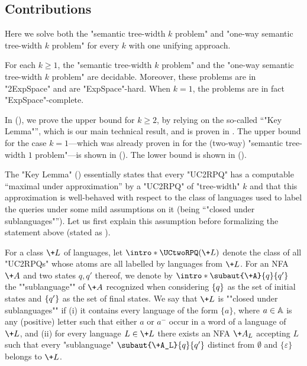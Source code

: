 \subsection{\AP{}Contributions}
Here we solve both the "semantic tree-width $k$ problem" and "one-way semantic tree-width $k$ problem" for every $k$ with one unifying approach.
\begin{theorem}
    \AP\label{thm:decidability-semtw}
    For each $k \geq 1$, the "semantic tree-width $k$ problem" and the "one-way semantic tree-width $k$ problem" are decidable. Moreover, these problems are in "2ExpSpace" and are "ExpSpace"-hard.
	When $k=1$, the problems are in fact "ExpSpace"-complete.
\end{theorem}
In  (),
we prove the upper bound for $k\geq 2$, by relying on the so-called ``"Key Lemma"'', which is our main technical result, and is proven in .
The upper bound for the case $k=1$---which was already proven in \cite{BarceloRomeroVardi2016SemanticAcyclicity} for the (two-way) "semantic tree-width $1$ problem"---is shown in  (). The lower bound is shown in  ().

The "Key Lemma" () essentially states that
every "UC2RPQ" has a computable ``maximal under approximation'' by a "UC2RPQ" of "tree-width" $k$ and that this approximation is well-behaved with respect to the class of languages used to label the queries under some mild assumptions on it (being ``"closed under sublanguages"''). Let us first
explain this assumption before formalizing the statement above (stated as ).

For a class $\+L$ of languages, let $\intro*\UCtwoRPQ(\+L)$ denote the class of all "UC2RPQs" whose atoms are all labelled by languages from $\+L$.
\AP For an NFA $\+A$ and two states $q,q'$ thereof, we denote by $\intro*\subaut{\+A}{q}{q'}$ the ""sublanguage"" of $\+A$ recognized  when considering $\{q\}$ as the set of initial states and $\{q'\}$ as the set of final states.
\AP We say that $\+L$ is ""closed under sublanguages"" if
(i) it contains every language of the form $\{a\}$,
where $a \in \mathbb{A}$ is any (positive) letter such that either $a$ or $a^-$ occur in a word of a
language of $\+L$, and (ii) for every language $L \in \+L$ there exists an NFA $\+A_L$ accepting $L$ such that every "sublanguage" $\subaut{\+A_L}{q}{q'}$ distinct from $\emptyset$ and
$\{\varepsilon\}$ belongs to $\+L$.

